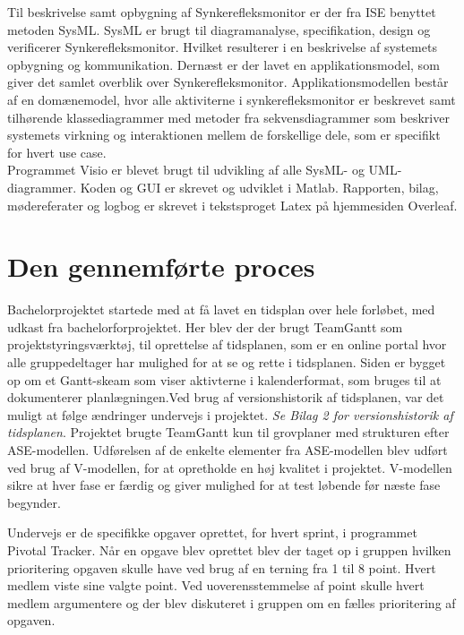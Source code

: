 Til beskrivelse samt opbygning af Synkerefleksmonitor er der fra ISE benyttet metoden SysML. SysML er brugt til diagramanalyse, specifikation, design og verificerer Synkerefleksmonitor. Hvilket resulterer i en beskrivelse af systemets opbygning og kommunikation. Dernæst er der lavet en applikationsmodel, som giver det samlet overblik over Synkerefleksmonitor. Applikationsmodellen består af en domænemodel, hvor alle aktiviterne i synkerefleksmonitor er beskrevet samt tilhørende klassediagrammer med metoder fra sekvensdiagrammer som beskriver systemets virkning og interaktionen mellem de forskellige dele, som er specifikt for hvert use case.\\

Programmet Visio er blevet brugt til udvikling af alle SysML- og UML-diagrammer. Koden og GUI er skrevet og udviklet i Matlab. Rapporten, bilag, mødereferater og logbog er skrevet i tekstsproget Latex på hjemmesiden Overleaf. 

\section{Den gennemførte proces}

Bachelorprojektet startede med at få lavet en tidsplan over hele forløbet, med udkast fra bachelorforprojektet. Her blev der der brugt TeamGantt som projektstyringsværktøj, til oprettelse af tidsplanen, som er en online portal hvor alle gruppedeltager har mulighed for at se og rette i tidsplanen. Siden er bygget op om et Gantt-skeam som viser aktivterne i kalenderformat, som bruges til at dokumenterer planlægningen\cite[s. 297]{IntroductionCompendium}.Ved brug af versionshistorik af tidsplanen, var det muligt at følge ændringer undervejs i projektet. \textit{Se Bilag 2 for versionshistorik af tidsplanen}. Projektet brugte TeamGantt kun til grovplaner med strukturen efter ASE-modellen. Udførelsen af de enkelte elementer fra ASE-modellen blev udført ved brug af V-modellen, for at opretholde en høj kvalitet i projektet. V-modellen sikre at hver fase er færdig og giver mulighed for at test løbende før næste fase begynder\cite[s. 12]{IngenirhjskolenAarhusUniversitetDevelopmentASE}. 




Undervejs er de specifikke opgaver oprettet, for hvert sprint, i programmet Pivotal Tracker. Når en opgave blev oprettet blev der taget op i gruppen hvilken prioritering opgaven skulle have ved brug af en terning fra 1 til 8 point. Hvert medlem viste sine valgte point. Ved uoverensstemmelse af point skulle hvert medlem argumentere og der blev diskuteret i gruppen om en fælles prioritering af opgaven.  






